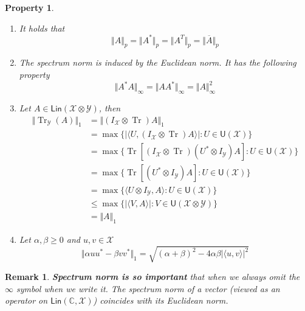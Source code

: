 \documentclass[aps,pra,onecolumn,notitlepage,superscriptaddress]{revtex4-1}
\newcommand{\C}{\mathbb{C}}
\newcommand{\spc}[1]{\mathcal{#1}}
\newcommand{\Lin}{\mathsf{Lin}}
\newcommand{\U}{\mathsf{U}}
\def\>{\rangle}
\def\<{\langle}
\newcommand{\Tr}{\operatorname{Tr}}
\newtheorem{rem}{Remark}
\newtheorem{proper}{Property}
\begin{document}
\begin{proper}
\begin{enumerate}
            \item It holds that
            \begin{equation}
                \Vert A \Vert_p = \Vert A^* \Vert_p = \Vert A^T \Vert_p = \Vert \overline{A} \Vert_p
            \end{equation}

            \item The spectrum norm is induced by the Euclidean norm. It has the following property
            \begin{equation}
                \Vert A^*A \Vert_{\infty} = \Vert AA^* \Vert_{\infty} = \Vert A \Vert_{\infty}^2
            \end{equation}

            \item Let $A \in \Lin(\spc X \otimes \spc Y)$, then 
            \begin{align*}
                \Vert \Tr_{\spc Y}(A) \Vert_1 
                &= \Vert (I_{\spc X} \otimes \Tr)A \Vert_1 \\
                &= \max\{ |\< U,(I_{\spc X} \otimes \Tr)A \>| : U \in \U(\spc X) \} \\
                &= \max\{ \Tr[(I_{\spc X} \otimes \Tr)(U^* \otimes I_{\spc Y})A] : U \in \U(\spc X) \} \\
                &= \max\{ \Tr[(U^* \otimes I_{\spc Y})A] : U \in \U(\spc X) \} \\
                &= \max\{ \<U \otimes I_{\spc Y}, A\> : U \in \U(\spc X) \} \\
                &\leq \max\{ |\< V,A \>| : V \in \U(\spc X \otimes \spc Y) \} \\
                &= \Vert A \Vert_1
            \end{align*}
            
            \item Let $\alpha, \beta \geq 0$ and $u, v \in \spc X$
            \begin{equation}
                \Vert \alpha uu^* - \beta vv^* \Vert_1 = \sqrt{(\alpha+\beta)^2 - 4 \alpha \beta |\< u,v \>|^2 }
            \end{equation}
        \end{enumerate}
    \end{proper}

    \begin{rem}
        \textbf{Spectrum norm is so important} that when we always omit the $\infty$ symbol when we write it. The spectrum norm of a vector (viewed as an operator on $\Lin(\C, \spc X)$) coincides with its Euclidean norm.
    \end{rem}
\end{document}
